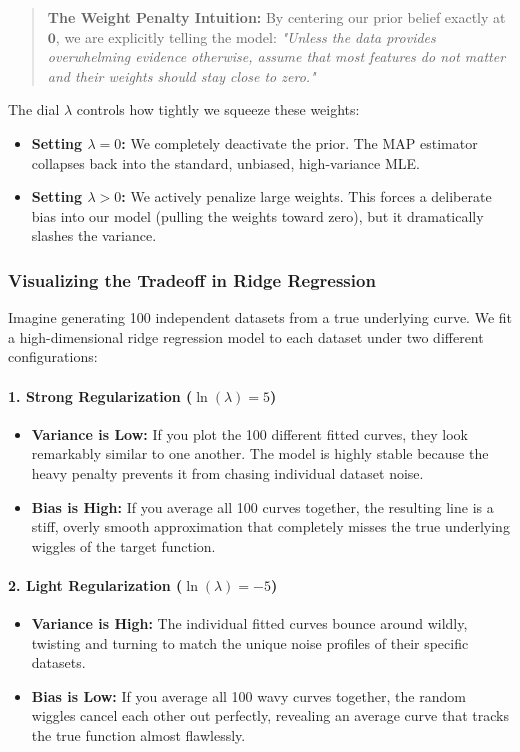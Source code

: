 \documentclass{article}
\begin{document}
\begin{quotation}
\textbf{The Weight Penalty Intuition:}
By centering our prior belief exactly at $\mathbf{0}$, we are explicitly telling the model: \textit{"Unless the data provides overwhelming evidence otherwise, assume that most features do not matter and their weights should stay close to zero."} 
\end{quotation}

The dial $\lambda$ controls how tightly we squeeze these weights:
\begin{itemize}
    \item \textbf{Setting $\lambda = 0$:} We completely deactivate the prior. The MAP estimator collapses back into the standard, unbiased, high-variance MLE.
    \item \textbf{Setting $\lambda > 0$:} We actively penalize large weights. This forces a deliberate bias into our model (pulling the weights toward zero), but it dramatically slashes the variance.
\end{itemize}

\subsubsection{Visualizing the Tradeoff in Ridge Regression}
Imagine generating 100 independent datasets from a true underlying curve. We fit a high-dimensional ridge regression model to each dataset under two different configurations:

\paragraph{1. Strong Regularization ($\ln(\lambda) = 5$)}
\begin{itemize}
    \item \textbf{Variance is Low:} If you plot the 100 different fitted curves, they look remarkably similar to one another. The model is highly stable because the heavy penalty prevents it from chasing individual dataset noise.
    \item \textbf{Bias is High:} If you average all 100 curves together, the resulting line is a stiff, overly smooth approximation that completely misses the true underlying wiggles of the target function.
\end{itemize}

\paragraph{2. Light Regularization ($\ln(\lambda) = -5$)}
\begin{itemize}
    \item \textbf{Variance is High:} The individual fitted curves bounce around wildly, twisting and turning to match the unique noise profiles of their specific datasets.
    \item \textbf{Bias is Low:} If you average all 100 wavy curves together, the random wiggles cancel each other out perfectly, revealing an average curve that tracks the true function almost flawlessly.
\end{itemize}
\end{document}
